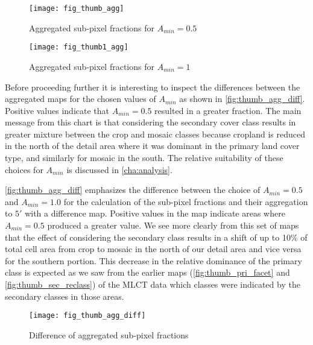 \begin{figure}[htp] 
\centering
  

\texttt{[image: fig\_thumb\_agg]}
 
\caption{Aggregated sub-pixel fractions for $A_{min}=0.5$}
\label{fig:thumb_agg}
\end{figure} 

\begin{figure}[htp] 
\centering
  

\texttt{[image: fig\_thumb1\_agg]}
 
\caption{Aggregated sub-pixel fractions for $A_{min}=1$}
\label{fig:thumb1_agg}
\end{figure} 


Before proceeding further it is interesting to inspect the differences
between the aggregated maps for the chosen values of $A_{min}$ as
shown in \autoref{fig:thumb_agg_diff}.  Positive values indicate that
$A_{min} = 0.5$ resulted in a greater fraction.  The main message from
this chart is that considering the secondary cover class results in
greater mixture between the crop and mosaic classes because cropland
is reduced in the north of the detail area where it was dominant in
the primary land cover type, and similarly for mosaic in the south.
The relative suitability of these choices for $A_{min}$ is discussed
in \autoref{cha:analysis}.



\autoref{fig:thumb_agg_diff} emphasizes the difference between the
choice of $A_{min}=0.5$ and $A_{min}=1.0$ for the calculation of the
sub-pixel fractions and their aggregation to $5'$ with a difference
map.  Positive values in the map indicate areas where $A_{min}=0.5$
produced a greater value.  We see more clearly from this set of maps
that the effect of considering the secondary class results in a shift
of up to 10\% of total cell area from crop to mosaic in the north of
our detail area and vice versa for the southern portion.  This
decrease in the relative dominance of the primary class is expected as
we saw from the earlier maps (\autoref{fig:thumb_pri_facet} and
\autoref{fig:thumb_sec_reclass}) of the MLCT data which classes were
indicated by the secondary classes in those areas.

\begin{figure}[htp]
\centering
  

\texttt{[image: fig\_thumb\_agg\_diff]}
 
\caption{ Difference of aggregated sub-pixel fractions}
\label{fig:thumb_agg_diff}
\end{figure} 

